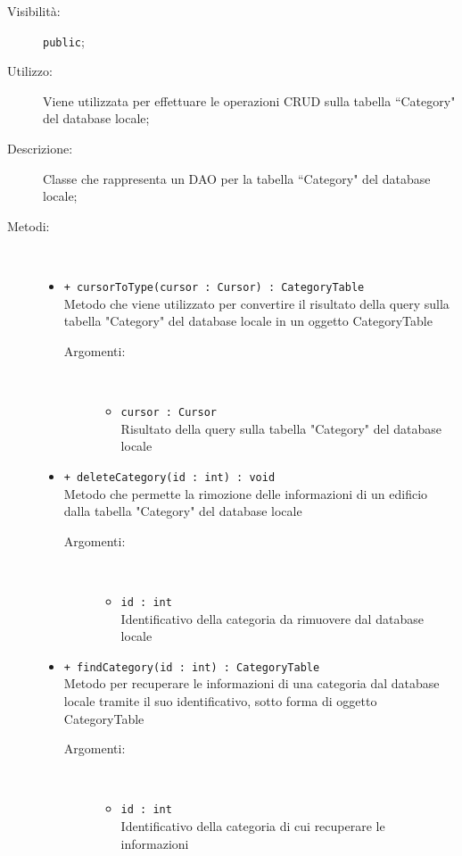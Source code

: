 \documentclass[../DefinizioneDiProdotto.tex]{subfiles}
\begin{document}
\begin{description}
\begin{itemize}
\end{itemize}
\item[Visibilità:] \texttt{public};
\item[Utilizzo:] Viene utilizzata per effettuare le operazioni CRUD sulla tabella “Category" del database locale;
\item[Descrizione:] Classe che rappresenta un DAO per la tabella “Category" del database locale;
\item[Metodi:] \
\begin{itemize}
\item \texttt{+ cursorToType(cursor : Cursor) : CategoryTable}\\
Metodo che viene utilizzato per convertire il risultato della query sulla tabella "Category" del database locale in un oggetto CategoryTable
 \begin{description}
\item[Argomenti:] \
\begin{itemize}
\item \texttt{cursor : Cursor}\\
Risultato della query sulla tabella "Category" del database locale\end{itemize}
\end{description}
\item \texttt{+ deleteCategory(id : int) : void}\\
Metodo che permette la rimozione delle informazioni di un edificio dalla tabella "Category" del database locale
 \begin{description}
\item[Argomenti:] \
\begin{itemize}
\item \texttt{id : int}\\
Identificativo della categoria da rimuovere dal database locale\end{itemize}
\end{description}
\item \texttt{+ findCategory(id : int) : CategoryTable}\\
Metodo per recuperare le informazioni di una categoria dal database locale tramite il suo identificativo, sotto forma di oggetto CategoryTable
 \begin{description}
\item[Argomenti:] \
\begin{itemize}
\item \texttt{id : int}\\
Identificativo della categoria di cui recuperare le informazioni\end{itemize}

\end{description}
\end{itemize}
\end{description}
\end{document}
